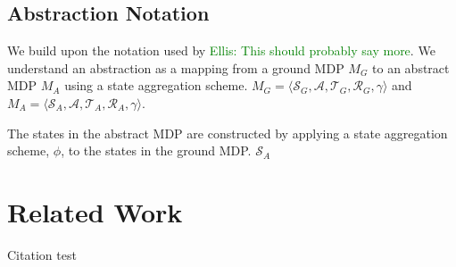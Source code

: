 \documentclass{article}
\newcommand\enote[1]{\textcolor{green}{Ellis: #1}}
\begin{document}
\subsection{Abstraction Notation}
We build upon the notation used by \cite{li2006towards} \enote{This should probably say more}.
We understand an abstraction as a mapping from a ground MDP $M_G$ to an abstract MDP $M_A$ using a state aggregation scheme. $M_G = \langle \mathcal{S}_G, \mathcal{A}, \mathcal{T}_G, \mathcal{R}_G, \gamma \rangle$ and $M_A = \langle \mathcal{S}_A, \mathcal{A}, \mathcal{T}_A, \mathcal{R}_A, \gamma \rangle$. 

The states in the abstract MDP are constructed by applying a state aggregation scheme, $\phi$, to the states in the ground MDP. $\mathcal{S}_A$








\section{Related Work}

Citation test~\cite{li2006towards}
\end{document}
